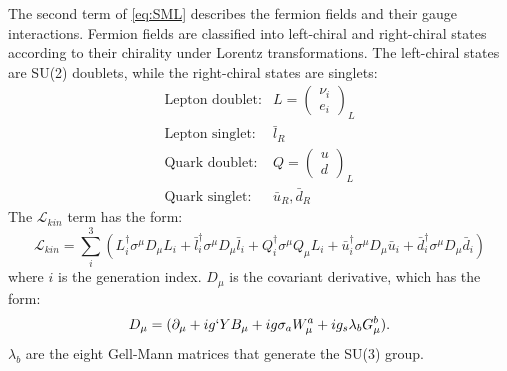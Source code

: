 \documentclass[thesis.tex]{subfiles}
\begin{document}
The second term  of \ref{eq:SML} describes the fermion fields and their gauge interactions. 
Fermion fields are classified into left-chiral and right-chiral states according to their chirality under Lorentz transformations. 
The left-chiral states are SU(2) doublets, while the right-chiral states are singlets:
	\begin{equation}
		\begin{array}{cl}
		\text{Lepton doublet}: & L = \left( \begin{array}{c} \nu_i \\ e_i \end{array} \right)_L \\
		\text{Lepton singlet}:  & \bar{l}_{R} \\
		\text{Quark doublet}:  & Q =  \left( \begin{array}{c} u \\ d \end{array} \right)_L \\
		\text{Quark singlet}:    & \bar{u}_{R}, \bar{d}_{R}
		\end{array}
		\label{eq:SML}
	\end{equation}
The $\mathcal{L}_{kin}$ term has the form: 
	\begin{equation}
		\mathcal{L}_{kin} =  \sum_{i}^3 \left( L_i^\dagger \sigma^\mu D_\mu L_i +
									\bar{l}_i^\dagger \sigma^\mu D_\mu \bar{l}_i + 
									Q_i^\dagger \sigma^\mu Q_\mu L_i +
									\bar{u}_i^\dagger \sigma^\mu D_\mu \bar{u}_i +
									\bar{d}_i^\dagger \sigma^\mu D_\mu \bar{d}_i \right)
	\end{equation}
where $i$ is the generation index. $D_\mu$ is the covariant derivative, which has the form: 
	\begin{equation}
		D_\mu = (\partial_\mu + i g`YB_\mu + i g \sigma_a W_\mu^a + ig_s \lambda_b G_\mu^{b} ).
	\end{equation}
$\lambda_b$ are the eight Gell-Mann matrices that generate the SU(3) group. 
 
\end{document}
